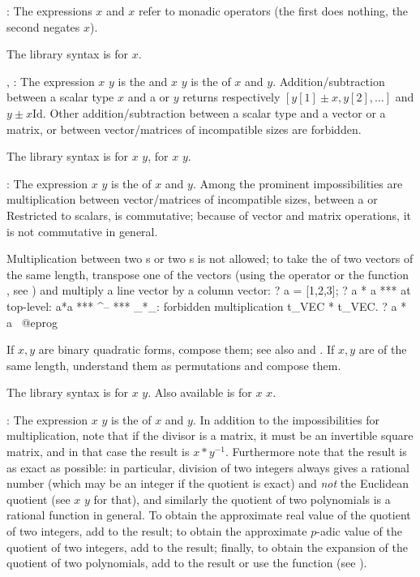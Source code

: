 \subseckbd{+$/$-}: The expressions \kbd{+}$x$ and \kbd{-}$x$ refer
to monadic operators (the first does nothing, the second negates $x$).

The library syntax is  for \kbd{-}$x$.

\subseckbd{+}, \kbd{-}: The expression $x$ \kbd{+} $y$ is the  and
$x$ \kbd{-} $y$ is the  of $x$ and $y$. Addition/subtraction
between a scalar type $x$ and a  or  $y$ returns
respectively $[y[1] \pm x, y[2],\dots]$ and $y \pm x \text{Id}$. Other
addition/subtraction between a scalar type and a vector or a matrix, or
between vector/matrices of incompatible sizes are forbidden.

The library syntax is  for $x$ \kbd{+} $y$,
 for $x$ \kbd{-} $y$.

\subseckbd{*}: The expression $x$ \kbd{*} $y$ is the  of $x$
and $y$. Among the prominent impossibilities are multiplication between
vector/matrices of incompatible sizes, between a  or 
Restricted to scalars, \kbd{*} is commutative; because of vector and matrix
operations, it is not commutative in general.

Multiplication between two s or two s is not
allowed; to take the  of two vectors of the same length,
transpose one of the vectors (using the operator \kbd{\til} or the function
, see ) and multiply a line vector
by a column vector:
\bprog
? a = [1,2,3];
? a * a
  ***   at top-level: a*a
  ***                  ^--
  *** _*_: forbidden multiplication t_VEC * t_VEC.
? a * a~
@eprog

If $x,y$ are binary quadratic forms, compose them; see also
 and . If $x,y$ are  of the same
length, understand them as permutations and compose them.

The library syntax is  for $x$ \kbd{*} $y$.
Also available is  for $x$ \kbd{*} $x$.

\subseckbd{/}: The expression $x$ \kbd{/} $y$ is the  of $x$
and $y$. In addition to the impossibilities for multiplication, note that if
the divisor is a matrix, it must be an invertible square matrix, and in that
case the result is $x*y^{-1}$. Furthermore note that the result is as exact
as possible: in particular, division of two integers always gives a rational
number (which may be an integer if the quotient is exact) and \emph{not} the
Euclidean quotient (see $x$ \kbd{\bs} $y$ for that), and similarly the
quotient of two polynomials is a rational function in general. To obtain the
approximate real value of the quotient of two integers, add  to the
result; to obtain the approximate $p$-adic value of the quotient of two
integers, add  to the result; finally, to obtain the
 expansion of the quotient of two polynomials, add
 to the result or use the  function
(see ). \label{se:gdiv}

